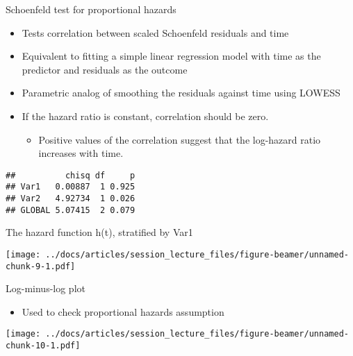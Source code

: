 \documentclass[
  ignorenonframetext,
]{beamer}
\providecommand{\tightlist}{%
  \setlength{\itemsep}{0pt}\setlength{\parskip}{0pt}}
\begin{document}
\begin{frame}[fragile]{Schoenfeld test for proportional hazards}
\protect\hypertarget{schoenfeld-test-for-proportional-hazards}{}

\begin{itemize}
\tightlist
\item
  Tests correlation between scaled Schoenfeld residuals and time
\item
  Equivalent to fitting a simple linear regression model with time as
  the predictor and residuals as the outcome
\item
  Parametric analog of smoothing the residuals against time using LOWESS
\item
  If the hazard ratio is constant, correlation should be zero.

  \begin{itemize}
  \tightlist
  \item
    Positive values of the correlation suggest that the log-hazard ratio
    increases with time.
  \end{itemize}
\end{itemize}

\begin{verbatim}
##          chisq df     p
## Var1   0.00887  1 0.925
## Var2   4.92734  1 0.026
## GLOBAL 5.07415  2 0.079
\end{verbatim}

\end{frame}

\begin{frame}{The hazard function h(t), stratified by Var1}
\protect\hypertarget{the-hazard-function-ht-stratified-by-var1}{}

\texttt{[image: ../docs/articles/session\_lecture\_files/figure-beamer/unnamed-chunk-9-1.pdf]}

\end{frame}

\begin{frame}{Log-minus-log plot}
\protect\hypertarget{log-minus-log-plot}{}

\begin{itemize}
\tightlist
\item
  Used to check proportional hazards assumption
\end{itemize}

\texttt{[image: ../docs/articles/session\_lecture\_files/figure-beamer/unnamed-chunk-10-1.pdf]}

\end{frame}
\end{document}
